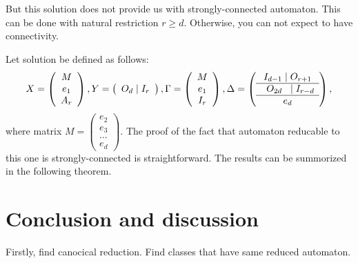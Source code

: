 \documentclass[11pt]{llncs}
\newcommand{\G}{\Gamma}
\newcommand{\D}{\Delta}
\begin{document}
But this solution does not provide us with strongly-connected automaton. This can be done
with natural restriction $r \geq d$. Otherwise, you can not expect to have connectivity.

Let solution be defined as follows:
$$
X =
\left(
\begin{array}{c}
M \\
e_1 \\
A_r
\end{array}
\right),
Y = 
\left(
\begin{array}{c}
O_d \mid I_r
\end{array}
\right),
\G = 
\left(
\begin{array}{c}
M \\
e_1 \\
I_r
\end{array}
\right),
\D = 
\left(
\begin{array}{c}
I_{d - 1} \mid O_{r + 1} \\ \hline
\textbf{\,\,\,} O_{2d} \textbf{\,\,\,} \mid I_{r - d} \\ \hline
e_d
\end{array}
\right),
$$
where matrix $M =
\left(
\begin{smallmatrix}
e_2\\
e_3\\
\ldots\\
e_d
\end{smallmatrix}\right).$
The proof of the fact that automaton reducable to this one is strongly-connected is
straightforward. The results can be summorized in the following theorem.


\section{Conclusion and discussion}
Firstly, find canocical reduction. Find classes that have same reduced automaton.
\end{document}
